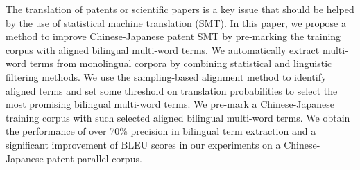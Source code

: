The translation of patents or scientific papers is a key issue that should be helped by the use of statistical machine translation (SMT). In this paper, we propose a method to improve Chinese-Japanese patent SMT by pre-marking the training corpus with aligned bilingual multi-word terms. We automatically extract multi-word terms from monolingual corpora by combining statistical and linguistic filtering methods. We use the sampling-based alignment method to identify aligned terms and set some threshold on translation probabilities to select the most promising bilingual multi-word terms. We pre-mark a Chinese-Japanese training corpus with such selected aligned bilingual multi-word terms. We obtain the performance of over 70\% precision in bilingual term extraction and a significant improvement of BLEU scores in our experiments on a Chinese-Japanese patent parallel corpus.
